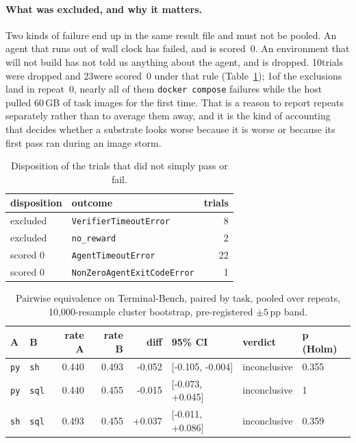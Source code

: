 \documentclass[11pt,a4paper]{article}
\begin{document}
\paragraph{What was excluded, and why it matters.}
Two kinds of failure end up in the same result file and must not be pooled.
An agent that runs out of wall clock has failed, and is scored~0. An
environment that will not build has not told us anything about the agent, and
is dropped. 10trials were dropped and 23were scored~0
under that rule (Table~\ref{tab:tbexclusions}); 1of the
exclusions land in repeat~0, nearly all of them \texttt{docker compose}
failures while the host pulled 60\,GB of task images for the first time. That
is a reason to report repeats separately rather than to average them away, and
it is the kind of accounting that decides whether a substrate looks worse
because it is worse or because its first pass ran during an image storm.

\begin{table}[h]\centering\small
\caption{Disposition of the trials that did not simply pass or fail.}
\label{tab:tbexclusions}
\begin{tabular}{llr}
\toprule
disposition & outcome & trials \\
\midrule
excluded & \texttt{VerifierTimeoutError} & 8 \\
excluded & \texttt{no\_reward} & 2 \\
scored 0 & \texttt{AgentTimeoutError} & 22 \\
scored 0 & \texttt{NonZeroAgentExitCodeError} & 1 \\
\bottomrule
\end{tabular}
\end{table}

\begin{table}[h]\centering\small
\caption{Pairwise equivalence on Terminal-Bench, paired by task, pooled over
repeats, 10{,}000-resample cluster bootstrap, pre-registered $\pm5$\,pp band.}
\label{tab:tbequiv}
\begin{tabular}{llrrrlll}
\toprule
A & B & rate A & rate B & diff & 95\% CI & verdict & p (Holm) \\
\midrule
\texttt{py} & \texttt{sh} & 0.440 & 0.493 & -0.052 & [-0.105, -0.004] & inconclusive & 0.355 \\
\texttt{py} & \texttt{sql} & 0.440 & 0.455 & -0.015 & [-0.073, +0.045] & inconclusive & 1 \\
\texttt{sh} & \texttt{sql} & 0.493 & 0.455 & +0.037 & [-0.011, +0.086] & inconclusive & 0.359 \\
\bottomrule
\end{tabular}
\end{table}
\end{document}
